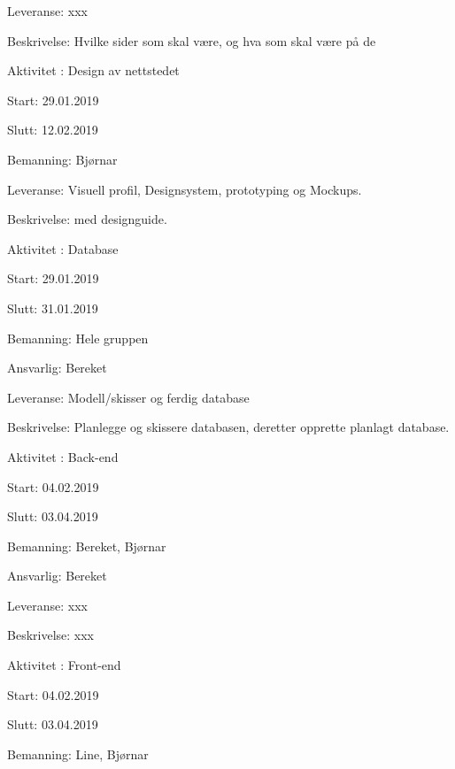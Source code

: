 \documentclass[11pt,a4paper]{report}
\begin{document}
\begin{compactdesc}
\begin{compactitem}
	\item Leveranse: xxx
	\item Beskrivelse: Hvilke sider som skal være, og hva som skal være på de
	\addtocounter{aktivitetTeller}{1}
	\end{compactitem}
	\item [Aktivitet \arabic{aktivitetTeller}:] Design av nettstedet
	\begin{compactitem}
	\item Start: 29.01.2019
	\item Slutt: 12.02.2019
	\item Bemanning: Bjørnar
	\item Leveranse: Visuell profil, Designsystem, prototyping og Mockups. 
	\item Beskrivelse: med designguide.
	\addtocounter{aktivitetTeller}{1}
	\end{compactitem}
	\item [Aktivitet \arabic{aktivitetTeller}:] Database 
	\begin{compactitem}
	\item Start: 29.01.2019
	\item Slutt: 31.01.2019
	\item Bemanning: Hele gruppen
	\item Ansvarlig: Bereket
	\item Leveranse: Modell/skisser og ferdig database
	\item Beskrivelse: Planlegge og skissere databasen, deretter opprette planlagt database.
	\addtocounter{aktivitetTeller}{1}
	\end{compactitem}
	\item [Aktivitet \arabic{aktivitetTeller}:] Back-end
	\begin{compactitem}
	\item Start: 04.02.2019
	\item Slutt: 03.04.2019
	\item Bemanning: Bereket, Bjørnar
	\item Ansvarlig: Bereket
	\item Leveranse: xxx
	\item Beskrivelse: xxx
	\addtocounter{aktivitetTeller}{1}
	\end{compactitem}
	\item [Aktivitet \arabic{aktivitetTeller}:] Front-end
	\begin{compactitem}
	\item Start: 04.02.2019
	\item Slutt: 03.04.2019
	\item Bemanning: Line, Bjørnar

\end{compactitem}
\end{compactdesc}
\end{document}
